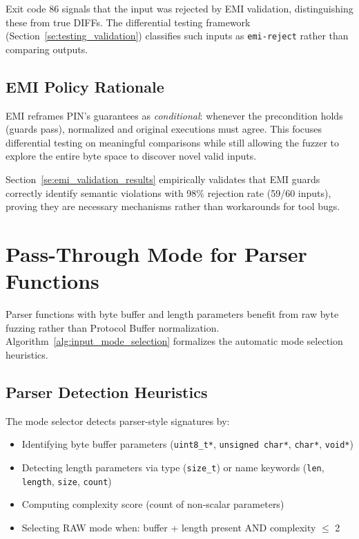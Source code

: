 \documentclass[doublespace,nopageskip]{VTthesis}
\begin{document}
  Exit code 86 signals that the input was rejected by EMI validation, distinguishing these from true DIFFs. The differential testing framework (Section~\ref{se:testing_validation}) classifies such inputs as \texttt{emi-reject} rather than comparing outputs.

  \subsection{EMI Policy Rationale}

  EMI reframes PIN's guarantees as \emph{conditional}: whenever the precondition holds (guards pass), normalized and original executions must agree. This focuses differential testing on meaningful comparisons while still allowing the fuzzer to explore the entire byte space to discover novel valid inputs.

  Section~\ref{se:emi_validation_results} empirically validates that EMI guards correctly identify semantic violations with 98\% rejection rate (59/60 inputs), proving they are necessary mechanisms rather than workarounds for tool bugs.

  \section{Pass-Through Mode for Parser Functions} \label{se:pass_through_mode}

  Parser functions with byte buffer and length parameters benefit from raw byte fuzzing rather than Protocol Buffer normalization. Algorithm~\ref{alg:input_mode_selection} formalizes the automatic mode selection heuristics.

  

  \subsection{Parser Detection Heuristics}

  The mode selector detects parser-style signatures by:
  \begin{itemize}
      \item Identifying byte buffer parameters (\texttt{uint8\_t*}, \texttt{unsigned char*}, \texttt{char*}, \texttt{void*})
      \item Detecting length parameters via type (\texttt{size\_t}) or name keywords (\texttt{len}, \texttt{length}, \texttt{size}, \texttt{count})
      \item Computing complexity score (count of non-scalar parameters)
      \item Selecting RAW mode when: buffer + length present AND complexity $\leq$ 2
  \end{itemize}
\end{document}
